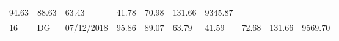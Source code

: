 \documentclass[
  11pt,
]{article}
\begin{document}
\begin{longtable}[]{@{}llllllllll@{}}
\begin{minipage}[t]{0.06\columnwidth}
94.63\strut
\end{minipage} & \begin{minipage}[t]{0.06\columnwidth}\raggedright
88.63\strut
\end{minipage} & \begin{minipage}[t]{0.06\columnwidth}\raggedright
63.43\strut
\end{minipage} & \begin{minipage}[t]{0.06\columnwidth}\raggedright
41.78\strut
\end{minipage} & \begin{minipage}[t]{0.06\columnwidth}\raggedright
70.98\strut
\end{minipage} & \begin{minipage}[t]{0.13\columnwidth}\raggedright
131.66\strut
\end{minipage} & \begin{minipage}[t]{0.08\columnwidth}\raggedright
9345.87\strut
\end{minipage}\tabularnewline
\begin{minipage}[t]{0.04\columnwidth}\raggedright
16\strut
\end{minipage} & \begin{minipage}[t]{0.09\columnwidth}\raggedright
DG\strut
\end{minipage} & \begin{minipage}[t]{0.10\columnwidth}\raggedright
07/12/2018\strut
\end{minipage} & \begin{minipage}[t]{0.06\columnwidth}\raggedright
95.86\strut
\end{minipage} & \begin{minipage}[t]{0.06\columnwidth}\raggedright
89.07\strut
\end{minipage} & \begin{minipage}[t]{0.06\columnwidth}\raggedright
63.79\strut
\end{minipage} & \begin{minipage}[t]{0.06\columnwidth}\raggedright
41.59\strut
\end{minipage} & \begin{minipage}[t]{0.06\columnwidth}\raggedright
72.68\strut
\end{minipage} & \begin{minipage}[t]{0.13\columnwidth}\raggedright
131.66\strut
\end{minipage} & \begin{minipage}[t]{0.08\columnwidth}\raggedright
9569.70\strut
\end{minipage}\tabularnewline

\end{longtable}
\end{document}
